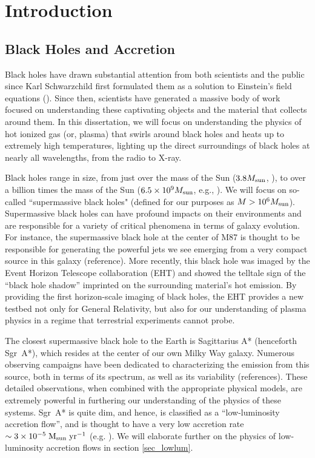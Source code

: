 \chapter[Introduction]
{Introduction}
\section{Black Holes and Accretion}

Black holes have drawn substantial attention from both scientists and the public since Karl Schwarzchild first formulated them as a solution to Einstein's field equations (\citealt{schwarzschild1916}).  Since then, scientists have generated a massive body of work focused on understanding these captivating objects and the material that collects around them.  In this dissertation, we will focus on understanding the physics of hot ionized gas (or, plasma) that swirls around black holes and heats up to extremely high temperatures, lighting up the direct surroundings of black holes at nearly all wavelengths, from the radio to X-ray.  

Black holes range in size, from just over the mass of the Sun ($3.8 M_{\rm{sun}}$, \citealt{smallbh}), to over a billion times the mass of the Sun ($6.5\times10^9 M_{\rm{sun}}$, e.g., \citealt{eht6}).  We will focus on so-called ``supermassive black holes" (defined for our purposes as $M>10^6 M_{\rm{sun}}$).  Supermassive black holes can have profound impacts on their environments and are responsible for a variety of critical phenomena in terms of galaxy evolution.  For instance, the supermassive black hole at the center of M87 is thought to be responsible for generating the powerful jets we see emerging from a very compact source in this galaxy (reference).  More recently, this black hole was imaged by the Event Horizon Telescope collaboration (EHT) and showed the telltale sign of the ``black hole shadow'' imprinted on the surrounding material's hot emission.  By providing the first horizon-scale imaging of black holes, the EHT provides a new testbed not only for General Relativity, but also for our understanding of plasma physics in a regime that terrestrial experiments cannot probe.

The closest supermassive black hole to the Earth is Sagittarius A* (henceforth Sgr~A*), which resides at the center of our own Milky Way galaxy.  Numerous observing campaigns have been dedicated to characterizing the emission from this source, both in terms of its spectrum, as well as its variability (references).  These detailed observations, when combined with the appropriate physical models, are extremely powerful in furthering our understanding of the physics of these systems.  Sgr~A* is quite dim, and hence, is classified as a ``low-luminosity accretion flow'', and is thought to have a very low accretion rate $\sim 3 \times 10^{-5} \; \rm{M_{sun}} \; \rm{yr}^{-1}$ (e.g. \citealt{quataert1999b}).  We will elaborate further on the physics of low-luminosity accretion flows in section \ref{sec_lowlum}.

